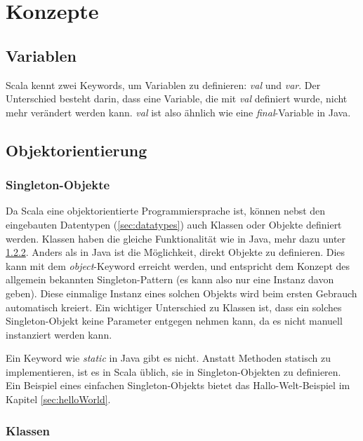 \chapter{Konzepte}

\section{Variablen}

Scala kennt zwei Keywords, um Variablen zu definieren: \emph{val} und 
\emph{var}. Der Unterschied besteht darin, dass eine Variable, die mit
\emph{val} definiert wurde, nicht mehr verändert werden kann. \emph{val}
ist also ähnlich wie eine \emph{final}-Variable in Java.

\section{Objektorientierung}

\subsection{Singleton-Objekte}
\label{sec:singleton}

Da Scala eine objektorientierte Programmiersprache ist, können nebst
den eingebauten Datentypen (\ref{sec:datatypes}) auch Klassen oder
Objekte definiert werden. Klassen haben die gleiche Funktionalität
wie in Java, mehr dazu unter \ref{sec:classes}.  Anders als in Java
ist die Möglichkeit, direkt Objekte zu definieren.  Dies kann mit dem
\emph{object}-Keyword erreicht werden, und entspricht dem Konzept des
allgemein bekannten Singleton-Pattern (es kann also nur eine Instanz davon
geben). Diese einmalige Instanz eines solchen Objekts wird beim ersten
Gebrauch automatisch kreiert. Ein wichtiger Unterschied zu Klassen ist,
dass ein solches Singleton-Objekt keine Parameter entgegen nehmen kann,
da es nicht manuell instanziert werden kann.

Ein Keyword wie \emph{static} in Java gibt es nicht. Anstatt
Methoden statisch zu implementieren, ist es in Scala üblich, sie in
Singleton-Objekten zu definieren.\\

Ein Beispiel eines einfachen Singleton-Objekts bietet das
Hallo-Welt-Beispiel im Kapitel \ref{sec:helloWorld}.

\subsection{Klassen}
\label{sec:classes}

